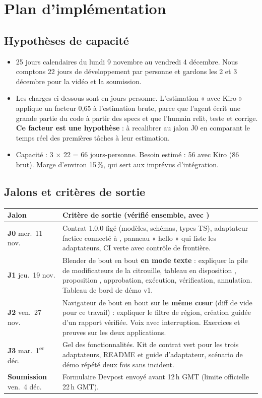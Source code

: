 \section{Plan d'implémentation}

\subsection{Hypothèses de capacité}

\begin{itemize}[leftmargin=1.2em]
  \item 25 jours calendaires du lundi 9 novembre au vendredi 4 décembre. Nous comptons 22 jours de développement par personne et gardons les 2 et 3 décembre pour la vidéo et la soumission.
  \item Les charges ci-dessous sont en jours-personne. L'estimation « avec Kiro » applique un facteur 0,65 à l'estimation brute, parce que l'agent écrit une grande partie du code à partir des specs et que l'humain relit, teste et corrige. \textbf{Ce facteur est une hypothèse} : à recalibrer au jalon J0 en comparant le temps réel des premières tâches à leur estimation.
  \item Capacité : 3 $\times$ 22 = 66 jours-personne. Besoin estimé : 56 avec Kiro (86 brut). Marge d'environ 15\,\%, qui sert aux imprévus d'intégration.
\end{itemize}

\subsection{Jalons et critères de sortie}

\begin{xltabular}{\textwidth}{@{}L{2.6cm}Y@{}}
\toprule
\textbf{Jalon} & \textbf{Critère de sortie (vérifié ensemble, avec )} \\
\midrule
\textbf{J0} mer.\ 11 nov. & Contrat 1.0.0 figé (modèles, schémas, types TS), adaptateur factice connecté à , panneau « hello » qui liste les adaptateurs, CI verte avec contrôle de frontière. \\
\textbf{J1} jeu.\ 19 nov. & Blender de bout en bout \textbf{en mode texte} : expliquer la pile de modificateurs de la citrouille, tableau en disposition , proposition , approbation, exécution, vérification, annulation. Tableau de bord de démo v1. \\
\textbf{J2} ven.\ 27 nov. & Navigateur de bout en bout sur \textbf{le même cœur} (diff de  vide pour ce travail) : expliquer le filtre de région, création guidée d'un rapport vérifiée. Voix avec interruption. Exercices et preuves sur les deux applications. \\
\textbf{J3} mar.\ 1\textsuperscript{er} déc. & Gel des fonctionnalités. Kit de contrat vert pour les trois adaptateurs, README et guide d'adaptateur, scénario de démo répété deux fois sans incident. \\
\textbf{Soumission} ven.\ 4 déc. & Formulaire Devpost envoyé avant 12\,h GMT (limite officielle 22\,h GMT). \\
\bottomrule
\end{xltabular}

